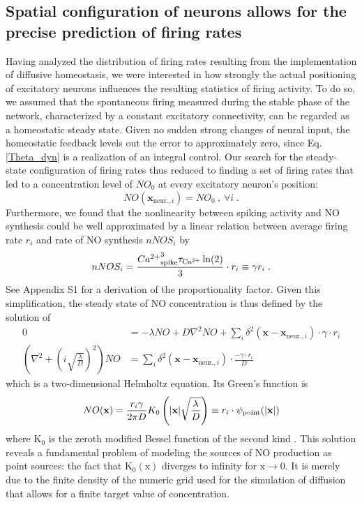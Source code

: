 \documentclass[10pt,letterpaper]{article}
\begin{document}
\subsection*{Spatial configuration of neurons allows for the precise prediction of firing rates}\label{Section_Rand_Mat_vs_Sim}
Having analyzed the distribution of firing rates resulting from the implementation of diffusive homeostasis, we were interested in how strongly the actual positioning of excitatory neurons influences the resulting statistics of firing activity. To do so, we assumed that the spontaneous firing measured during the stable phase of the network, characterized by a constant excitatory connectivity, can be regarded as a homeostatic steady state. Given no sudden strong changes of neural input, the homeostatic feedback levels out the error to approximately zero, since Eq. \ref{Theta_dyn} is a realization of an integral control. Our search for the steady-state configuration of firing rates thus reduced to finding a set of firing rates that led to a concentration level of $NO_0$ at every excitatory neuron's position:
\begin{equation}
NO(\mathbf{x}_{\mathrm{neur.},i}) = NO_0 \:, \: \forall i \; .
\label{NO_equil_cond}
\end{equation}
Furthermore, we found that the nonlinearity between spiking activity and NO synthesis could be well approximated by a linear relation between average firing rate $r_i$ and rate of NO synthesis $nNOS_i$ by
\begin{equation}
nNOS_i = \frac{{Ca^{2+}}^3_{\rm spike} \tau_{\rm Ca^{2+}}\ln(2)}{3} \cdot r_i \equiv \gamma r_i \; .
\label{simpl_nNOS}
\end{equation}
See Appendix S1 for a derivation of the proportionality factor. Given this simplification, the steady state of NO concentration is thus defined by the solution of
\begin{align}
0 &=-\lambda NO + D \nabla^2 NO + \sum_{i} \delta^2(\mathbf{x}-\mathbf{x}_{\mathrm{neur.},i})\cdot \gamma \cdot r_i \label{simple_NO_dyn_with_diff} \\
\left(\nabla^2 + \left( i\sqrt{\frac{\lambda}{D}}\right)^2\right) NO &= \sum_{i} \delta^2(\mathbf{x}-\mathbf{x}_{\mathrm{neur.},i})\cdot \frac{- \gamma \cdot r_i}{D}
\label{simple_NO_dyn_with_diff_equil_helmholtz}
\end{align}
which is a two-dimensional Helmholtz equation. Its Green's function is
\begin{equation}
NO(\mathbf{x}) = \frac{r_i \gamma}{2 \pi D} K_0 \left(|\mathbf{x}|\sqrt{\frac{\lambda}{D}} \right) \equiv r_i \cdot \psi_{\rm point}(|\mathbf{x}|)
\label{solution_diff_equil_bessel}
\end{equation}
where $\mathrm{K_0}$ is the zeroth modified Bessel function of the second kind \cite{Helmholtz_Solution_2d}.  This solution reveals a fundamental problem of modeling the sources of NO production as point sources: the fact that $\mathrm{K_0(x)}$ diverges to infinity for $\mathrm{x\rightarrow 0}$. It is merely due to the finite density of the numeric grid used for the simulation of diffusion that allows for a finite target value of concentration.
\end{document}
